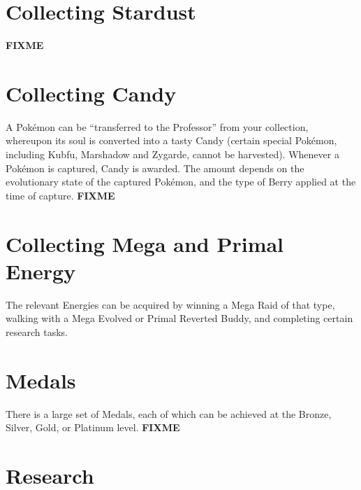 \section{Collecting Stardust}
\textbf{FIXME}

\section{Collecting Candy}
A Pokémon can be ``transferred to the Professor'' from your collection,
 whereupon its soul is converted into a tasty Candy (certain special
 Pokémon, including Kubfu, Marshadow and Zygarde, cannot be harvested).
Whenever a Pokémon is captured, Candy is awarded. The amount depends on
 the evolutionary state of the captured Pokémon, and the type of Berry
 applied at the time of capture.
\textbf{FIXME}

\section{Collecting Mega and Primal Energy}
The relevant Energies can be acquired by winning a Mega Raid of that type,
  walking with a Mega Evolved or Primal Reverted Buddy, and completing
  certain research tasks.

\section{Medals}
There is a large set of Medals, each of which can be achieved at the Bronze,
 Silver, Gold, or Platinum level.
\textbf{FIXME}

\section{Research}
\label{section:research}
